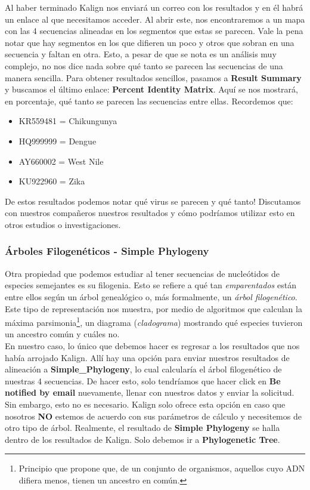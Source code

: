 \documentclass[10pt,letterpaper]{article}
\begin{document}
Al haber terminado Kalign nos enviar\'a un correo con los resultados y en \'el habr\'a un enlace al que necesitamos acceder. Al abrir este, nos encontraremos a un mapa con las 4 secuencias alineadas en los segmentos que estas se parecen. Vale la pena notar que hay segmentos en los que difieren un poco y otros que sobran en una secuencia y faltan en otra. Esto, a pesar de que se nota es un an\'alisis muy complejo, no nos dice nada sobre qu\'e tanto se parecen las secuencias de una manera sencilla. Para obtener resultados sencillos, pasamos a \textbf{Result Summary} y buscamos el \'ultimo enlace: \textbf{Percent Identity Matrix}. Aqu\'i se nos mostrar\'a, en porcentaje, qu\'e tanto se parecen las secuencias entre ellas. Recordemos que:

\begin{itemize}
\item KR559481 = Chikungunya
\item HQ999999 = Dengue
\item AY660002 = West Nile
\item KU922960 = Zika
\end{itemize}

De estos resultados podemos notar qu\'e virus se parecen y qu\'e tanto! Discutamos con nuestros compa\~neros nuestros resultados y c\'omo podr\'iamos utilizar esto en otros estudios o investigaciones.

\subsubsection{\'Arboles Filogen\'eticos - Simple Phylogeny}
Otra propiedad que podemos estudiar al tener secuencias de nucle\'otidos de especies semejantes es su filogenia. Esto se refiere a qu\'e tan \textit{emparentados} est\'an entre ellos seg\'un un \'arbol geneal\'ogico o, m\'as formalmente, un \emph{\'arbol filogen\'etico}. Este tipo de representaci\'on nos muestra, por medio de algoritmos que calculan la m\'axima parsimonia\footnote{Principio que propone que, de un conjunto de organismos, aquellos cuyo ADN difiera menos, tienen un ancestro en com\'un.}, un diagrama (\emph{cladograma}) mostrando qu\'e especies tuvieron un ancestro com\'un y cu\'ales no.\\

En nuestro caso, lo \'unico que debemos hacer es regresar a los resultados que nos hab\'ia arrojado Kalign. All\'i hay una opci\'on para enviar nuestros resultados de alineaci\'on a \textbf{Simple\_Phylogeny}, lo cual calcular\'ia el \'arbol filogen\'etico de nuestras 4 secuencias. De hacer esto, solo tendr\'iamos que hacer click en \textbf{Be notified by email} nuevamente, llenar con nuestros datos y enviar la solicitud. Sin embargo, esto no es necesario. Kalign solo ofrece esta opci\'on en caso que nosotros \textbf{NO} estemos de acuerdo con sus par\'ametros de c\'alculo y necesitemos de otro tipo de \'arbol. Realmente, el resultado de \textbf{Simple Phylogeny} se halla dentro de los resultados de Kalign. Solo debemos ir a \textbf{Phylogenetic Tree}.\\
\end{document}

